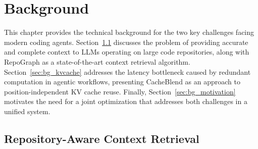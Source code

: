 \chapter{Background}
\label{cha:background}

This chapter provides the technical background for the two key challenges facing modern coding agents. Section~\ref{sec:bg_context} discusses the problem of providing accurate and complete context to LLMs operating on large code repositories, along with RepoGraph as a state-of-the-art context retrieval algorithm. Section~\ref{sec:bg_kvcache} addresses the latency bottleneck caused by redundant computation in agentic workflows, presenting CacheBlend as an approach to position-independent KV cache reuse. Finally, Section~\ref{sec:bg_motivation} motivates the need for a joint optimization that addresses both challenges in a unified system.

\section{Repository-Aware Context Retrieval}
\label{sec:bg_context}



